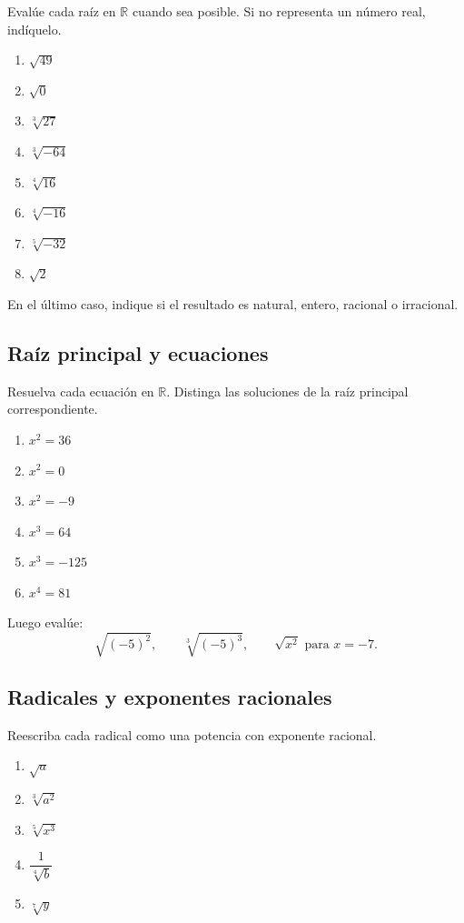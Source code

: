 Evalúe cada raíz en \(\mathbb R\) cuando sea posible. Si no representa un número real, indíquelo.

\begin{enumerate}
\item \(\sqrt{49}\)
\item \(\sqrt{0}\)
\item \(\sqrt[3]{27}\)
\item \(\sqrt[3]{-64}\)
\item \(\sqrt[4]{16}\)
\item \(\sqrt[4]{-16}\)
\item \(\sqrt[5]{-32}\)
\item \(\sqrt{2}\)
\end{enumerate}

En el último caso, indique si el resultado es natural, entero, racional o irracional.

\subsection*{Raíz principal y ecuaciones}

Resuelva cada ecuación en \(\mathbb R\). Distinga las soluciones de la raíz principal correspondiente.

\begin{enumerate}
\item \(x^2=36\)
\item \(x^2=0\)
\item \(x^2=-9\)
\item \(x^3=64\)
\item \(x^3=-125\)
\item \(x^4=81\)
\end{enumerate}

Luego evalúe:
\[
\sqrt{(-5)^2},
\qquad
\sqrt[3]{(-5)^3},
\qquad
\sqrt{x^2}\text{ para }x=-7.
\]

\subsection*{Radicales y exponentes racionales}

Reescriba cada radical como una potencia con exponente racional.

\begin{enumerate}
\item \(\sqrt a\)
\item \(\sqrt[3]{a^2}\)
\item \(\sqrt[5]{x^3}\)
\item \(\dfrac1{\sqrt[4]{b}}\)
\item \(\sqrt[7]{y}\)
\end{enumerate}


